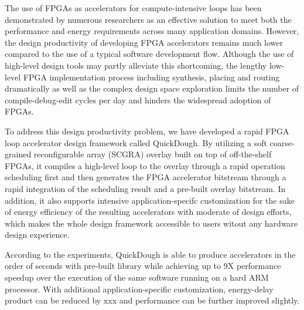 The use of FPGAs as accelerators for compute-intensive loops has been demonstrated by numerous researchers as an effective solution to meet both the performance and energy requirements across many application domains. However, the design productivity of developing FPGA accelerators remains much lower compared to the use of a typical software development flow. Although the use of high-level design tools may partly alleviate this shortcoming, the lengthy low-level FPGA implementation process including synthesis, placing and routing dramatically as well as the complex design space exploration limits the number of compile-debug-edit cycles per day and hinders the widespread adoption of FPGAs. 

To address this design productivity problem, we have developed a rapid FPGA loop accelerator design framework called QuickDough. By utilizing a soft coarse-grained reconfigurable array (SCGRA) overlay built on top of off-the-shelf FPGAs, it compiles a high-level loop to the overlay through a rapid operation scheduling first and then generates the FPGA accelerator bitstream through a rapid integration of the scheduling result and a pre-built overlay bitstream. In addition, it also supports intensive application-specifc customization for the sake of energy efficiency of the resulting accelerators with moderate of design efforts, which makes the whole design framework accessible to users witout any hardware design experience. 

According to the experiments, QuickDough is able to produce accelerators in the order of seconds with pre-built library while achieving up to 9X performance speedup over the execution of the same software running on a hard ARM processor. With additional application-specific customization, energy-delay product can be reduced by xxx and performance can be further improved slightly.
